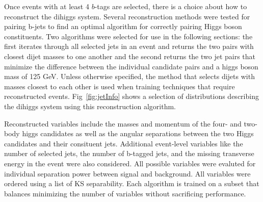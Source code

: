Once events with at least 4 $b$-tags are selected, there is a choice about how to reconstruct the dihiggs system. Several reconstruction methods were tested for pairing b-jets to find an optimal algorithm for correctly pairing Higgs boson constituents. Two algorithms were selected for use in the following sections: the first iterates through all selected jets in an event and returns the two pairs with closest dijet masses to one another and the second returns the two jet pairs that minimize the difference between the individual candidate pairs and a higgs boson mass of 125 GeV. Unless otherwise specified, the method that selects dijets with masses closest to each other is used when training techniques that require reconstructed events. Fig~\ref{fig:jetInfo} shows a selection of distributions describing the dihiggs system using this reconstruction algorithm.%


Reconstructed variables include the masses and momentum of the four- and two-body higgs candidates as well as the angular separations between the two Higgs candidates and their consituent jets. Additional event-level variables like the number of selected jets, the number of b-tagged jets, and the missing transverse energy in the event were also considered. All possible variables were evaluted for individual separation power between signal and background. All variables were ordered using a list of KS separability. Each algorithm is trained on a subset that balances minimizing the number of variables without sacrificing performance. 
